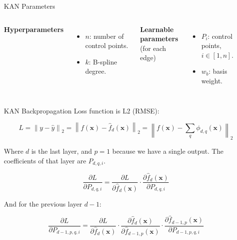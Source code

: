 \documentclass[aspectratio=169]{beamer}
\begin{document}
\begin{frame}{KAN Parameters}
	
	\begin{columns}[T,onlytextwidth]
		
		\centering
		\resizebox{!}{0.8\textheight}{}
		
		
		\textbf{Hyperparameters}
		\begin{itemize}
			\item $n$: number of control points.
			\item $k$: B-spline degree.
		\end{itemize}
		
		\vspace{0.8em}
		\textbf{Learnable parameters}\\(for each edge)
		\begin{itemize}
			\item $P_i$: control points, $i \in [1, n]$.
			\item $w_b$: basis weight.
		\end{itemize}
		
	\end{columns}
	
\end{frame}


\begin{frame}{KAN Backpropagation}
	Loss function is L2 (RMSE): 
	
	\begin{equation*}
		L = \left\| y - \hat{y} \right\|_2 = \left\| f(\mathbf{x}) - \hat{f}_{d}(\mathbf{x}) \right\|_2 = \left\| f(\mathbf{x}) - \sum_q \phi_{d,q}(\mathbf{x}) \right\|_2
	\end{equation*}
	
	Where $d$ is the last layer, and $p=1$ because we have a single output. The coefficients of that layer are $P_{d,q,i}$.
	
	\begin{equation*}
		\frac{\partial L}{\partial P_{d,q,i}} = \frac{\partial L}{\partial \hat{f}_{d}(\mathbf{x})} \cdot \frac{\partial \hat{f}_{d}(\mathbf{x})}{\partial P_{d,q,i}} 
	\end{equation*}
	
	And for the previous layer $d-1$:
	
	\begin{equation*}
		\frac{\partial L}{\partial P_{d-1,p,q,i}} = \frac{\partial L}{\partial \hat{f}_{d}(\mathbf{x})} \cdot \frac{\partial \hat{f}_{d}(\mathbf{x})}{\partial \hat{f}_{d-1,p}(\mathbf{x})} \cdot \frac{\partial \hat{f}_{d-1,p}(\mathbf{x})}{\partial P_{d-1,p,q,i}} 
	\end{equation*}
	
\end{frame}
\end{document}
